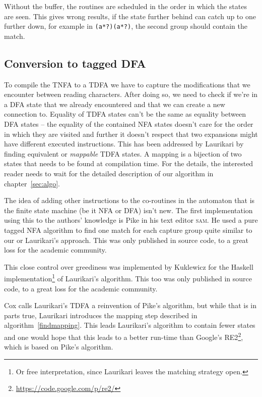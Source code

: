 \documentclass[11pt,a4paper,twoside,openright]{Thesis}
\theoremstyle{definition}
\begin{document}
Without the buffer, the routines are scheduled in the order in which the 
states are seen. This gives wrong results, if the state further behind can 
catch up to one further down, for example in \texttt{(a*?)(a*?)}, the second 
group should contain the match.

\subsection{Conversion to tagged DFA}

To compile the TNFA to a TDFA we have to capture the modifications that we 
encounter between reading characters. After doing so, we need to check if 
we're in a DFA state that we already encountered and that we can create a new 
connection to. Equality of TDFA states can't be the same as equality between 
DFA states -- the equality of the contained NFA states doesn't care for the 
order in which they are visited and further it doesn't respect that two 
expansions might have different executed instructions. This has been addressed
by Laurikari\cite{Laur00a} by finding equivalent or \emph{mappable} TDFA
states. A mapping is a bijection of two states that needs to be found at
compilation time. For the details, the interested reader needs to wait for the
detailed description of our algorithm in chapter~\ref{sec:algo}.

The idea of adding other instructions to the co-routines in the automaton
that is the finite state machine (be it NFA or DFA) isn't new. The first
implementation using this to the authors' knowledge is Pike\cite{Pike87a} in
his text editor \textsc{sam}. He used a pure tagged NFA algorithm to find one
match for each capture group quite similar to our or Laurikari's approach. This
was only published in source code, to a great loss for the academic community.

This close control over greediness was implemented by Kuklewicz\cite{Kukl07a}
for the Haskell implementation\footnote{Or free interpretation, since 
Laurikari leaves the matching strategy open.} of Laurikari's algorithm. This too was only
published in source code, to a great loss for the academic community.

Cox calls Laurikari's TDFA a reinvention of Pike's algorithm, but while that 
is in parts true, Laurikari introduces the mapping step described in 
algorithm~\ref{findmapping}. This leads Laurikari's algorithm to contain 
fewer states and one would hope that this leads to a better run-time than 
Google's \textsc{RE2}\footnote{\url{https://code.google.com/p/re2/}},
which is based on Pike's algorithm. 
\end{document}
